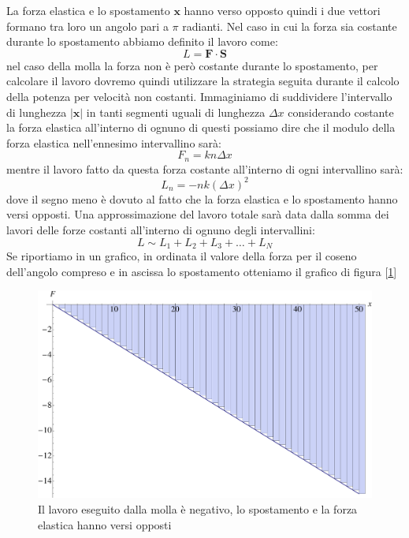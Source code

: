 \documentclass[a4paper,10pt,oneside]{article}
\begin{document}
La forza elastica e lo spostamento $\mathbf{x}$ hanno verso opposto quindi i due vettori formano tra loro un angolo pari a $\pi$ radianti. Nel caso in cui la forza sia costante durante lo spostamento abbiamo definito il lavoro come:
\begin{equation}
 L=\mathbf{F}\cdot \mathbf{S}
\end{equation}
nel caso della molla la forza non è però costante durante lo spostamento, per calcolare il lavoro dovremo quindi utilizzare la strategia seguita durante il calcolo della potenza per velocità non costanti.
Immaginiamo di suddividere l'intervallo di lunghezza $|\mathbf{x}|$ in tanti segmenti uguali di lunghezza $\Delta x$ considerando costante la forza elastica all'interno di ognuno di questi possiamo dire che il modulo della forza elastica nell'ennesimo intervallino sarà:
\begin{equation}
 F_n=kn\Delta x
\end{equation}
mentre il lavoro fatto da questa forza costante all'interno di ogni intervallino sarà:
\begin{equation}
L_n=-nk(\Delta x)^2
\end{equation}
dove il segno meno è dovuto al fatto che la forza elastica e lo spostamento hanno versi opposti.
Una approssimazione del lavoro totale sarà data dalla somma dei lavori delle forze costanti all'interno di ognuno degli intervallini:
\begin{equation}
 L\sim L_1+L_2+L_3+\ldots+L_N
\end{equation}
Se riportiamo in un grafico, in ordinata il valore della forza per il coseno dell'angolo compreso e in ascissa lo spostamento otteniamo il grafico di figura [\ref{fig:lavoro_molla_negativo}]
\begin{figure}[H]
 \centering
 \includegraphics[width=\textwidth]{./immagini/lavoro_molla_negativo.pdf}
 \caption{Il lavoro eseguito dalla molla è negativo, lo spostamento  e la forza elastica hanno versi opposti}
 \label{fig:lavoro_molla_negativo}
\end{figure}
\end{document}
